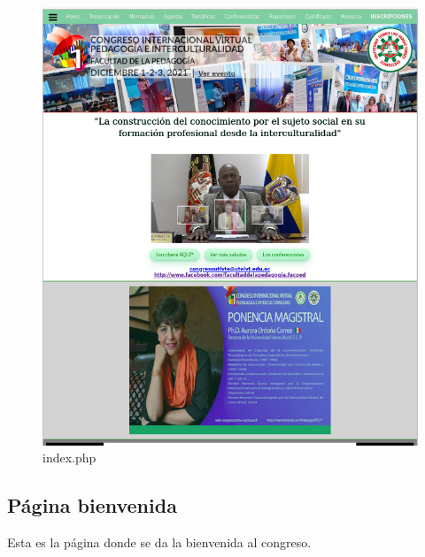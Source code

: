 \documentclass[a4paper,14px]{article}
\begin{document}
\begin{figure}[H]
  \centering
  \includegraphics[scale=0.6]{index.png}
  \caption{index.php }
  \label{fig:arquitectura}
\end{figure}




\newpage
\subsection{Página bienvenida }
\label{sec:pagina-principal}

Esta es la página donde se da la bienvenida al congreso.
\end{document}
